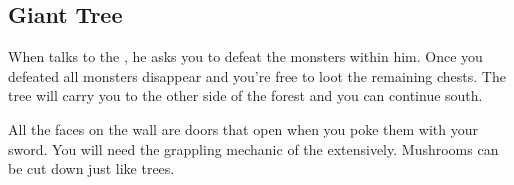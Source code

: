 \subsection{Giant Tree}
\label{map:giant_tree}

When  talks to the , he asks you to defeat the monsters within him. Once you defeated  all monsters disappear and you're free to loot the remaining chests. The tree will carry you to the other side of the forest and you can continue south.

All the faces on the wall are doors that open when you poke them with your sword. You will need the grappling mechanic of the  extensively. Mushrooms can be cut down just like trees.



